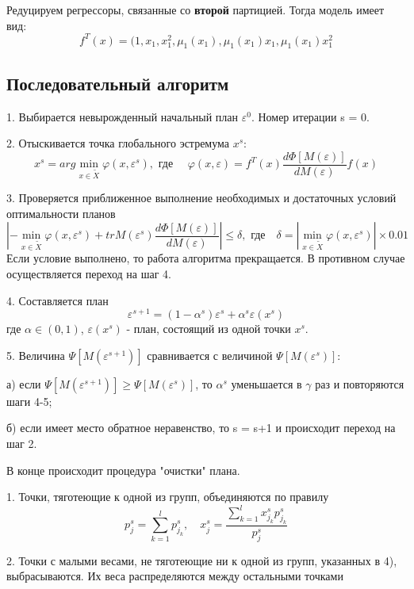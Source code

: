 Редуцируем регрессоры, связанные со \textbf{второй} партицией. Тогда модель имеет вид:
\[ f^T(x) = (1, x_1, x_1^2, \mu_1(x_1), \mu_1(x_1)x_1, \mu_1(x_1)x_1^2 \]




\subsection{Последовательный алгоритм}

1. Выбирается невырожденный начальный план $\varepsilon^0$. Номер итерации s = 0.

2. Отыскивается точка глобального эстремума $x^s$:
\[ x^s = arg \min_{x \in \tilde{X}}  \varphi(x, \varepsilon^s), \text{ где } \quad \varphi(x, \varepsilon) = f^T(x) \frac{d\Phi [M(\varepsilon)] }{ dM(\varepsilon) } f(x) \]

3. Проверяется приближенное выполнение необходимых и достаточных условий оптимальности планов
\[ \left| - \min_{x \in \tilde{X}}  \varphi(x, \varepsilon^s)
 + tr M(\varepsilon^s)  \frac{d\Phi [M(\varepsilon)] }{ dM(\varepsilon) } \right| \leq \delta,
\text{ где} \quad \delta = \left| \min_{x \in \tilde{X}}  \varphi(x, \varepsilon^s) \right| \times 0.01 \]
Если условие выполнено, то работа алгоритма прекращается. В противном случае осуществляется переход на шаг 4.

4. Составляется план
\[ \varepsilon^{s+1} = (1 - \alpha^s) \varepsilon^s + \alpha^s \varepsilon(x^s)\]
где $\alpha \in (0,1)$, $\varepsilon(x^s)$ - план, состоящий из одной точки $x^s$.

5. Величина $\Psi[M(\varepsilon^{s+1})]$ сравнивается с величиной $\Psi[M(\varepsilon^{s})]$:

а) если $\Psi[M(\varepsilon^{s+1})] \geq \Psi[M(\varepsilon^{s})]$, то $\alpha^s$ уменьшается в
$\gamma$ раз и повторяются шаги 4-5;

б) если имеет место обратное неравенство, то s = s+1 и происходит переход на шаг 2.
\vspace{5mm}



В конце происходит процедура "очистки" плана.

1. Точки, тяготеющие к одной из групп, объединяются по правилу
\[ p_j^s = \sum_{k=1}^l p_{j_k}^s, \quad x_j^s = \frac{\sum_{k=1}^l {x_{j_k}^s p_{j_k}^s}}{p_j^s} \]

2. Точки с малыми весами, не тяготеющие ни к одной из групп, указанных в 4), выбрасываются.
Их веса распределяются между остальными точками 


